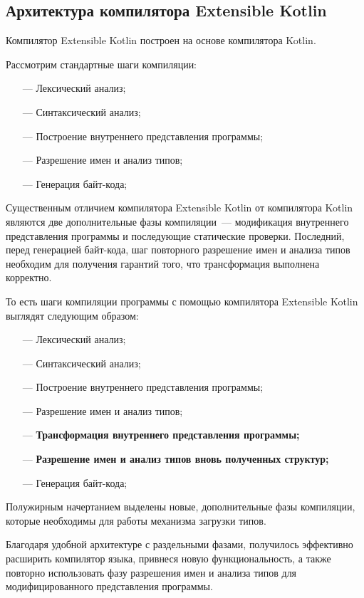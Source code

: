 \subsection{Архитектура компилятора Extensible Kotlin}\label{architecture}
Компилятор Extensible Kotlin построен на основе компилятора Kotlin.

Рассмотрим стандартные шаги компиляции:
\begin{itemize}
\item[---] Лексический анализ;
\item[---] Синтаксический анализ;
\item[---] Построение внутреннего представления программы;
\item[---] Разрешение имен и анализ типов;
\item[---] Генерация байт-кода;
\end{itemize}

Существенным отличием компилятора Extensible Kotlin от компилятора Kotlin являются две дополнительные фазы компиляции~--- модификация внутреннего представления программы и последующие статические проверки.
Последний, перед генерацией байт-кода, шаг повторного разрешение имен и анализа типов необходим для получения гарантий того, что трансформация выполнена корректно.
\begin{code}
То есть шаги компиляции программы с помощью компилятора Extensible Kotlin выглядят следующим образом:
\begin{itemize}
\item[---] Лексический анализ;
\item[---] Синтаксический анализ;
\item[---] Построение внутреннего представления программы;
\item[---] Разрешение имен и анализ типов;
\item[---] \textbf{Трансформация внутреннего представления программы;}
\item[---] \textbf{Разрешение имен и анализ типов вновь полученных структур;}
\item[---] Генерация байт-кода;
\end{itemize}
\end{code}

Полужирным начертанием выделены новые, дополнительные фазы компиляции, которые необходимы для работы механизма загрузки типов.

Благодаря удобной архитектуре с раздельными фазами, получилось эффективно расширить компилятор языка, привнеся новую функциональность,
а также повторно использовать фазу разрешения имен и анализа типов для модифицированного представления программы.

